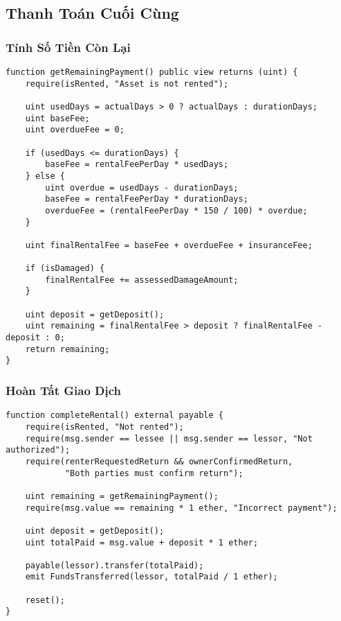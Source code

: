 \documentclass[12pt,a4paper]{article}
\begin{document}
\subsection{Thanh Toán Cuối Cùng}

\subsubsection{Tính Số Tiền Còn Lại}
\begin{lstlisting}[language=Solidity, caption=Tính toán số tiền còn phải trả]
function getRemainingPayment() public view returns (uint) {
    require(isRented, "Asset is not rented");

    uint usedDays = actualDays > 0 ? actualDays : durationDays;
    uint baseFee;
    uint overdueFee = 0;

    if (usedDays <= durationDays) {
        baseFee = rentalFeePerDay * usedDays;
    } else {
        uint overdue = usedDays - durationDays;
        baseFee = rentalFeePerDay * durationDays;
        overdueFee = (rentalFeePerDay * 150 / 100) * overdue;
    }

    uint finalRentalFee = baseFee + overdueFee + insuranceFee;

    if (isDamaged) {
        finalRentalFee += assessedDamageAmount;
    }

    uint deposit = getDeposit();
    uint remaining = finalRentalFee > deposit ? finalRentalFee - deposit : 0;
    return remaining;
}
\end{lstlisting}

\subsubsection{Hoàn Tất Giao Dịch}
\begin{lstlisting}[language=Solidity, caption=Hoàn tất và thanh toán cuối cùng]
function completeRental() external payable {
    require(isRented, "Not rented");
    require(msg.sender == lessee || msg.sender == lessor, "Not authorized");
    require(renterRequestedReturn && ownerConfirmedReturn, 
            "Both parties must confirm return");

    uint remaining = getRemainingPayment();
    require(msg.value == remaining * 1 ether, "Incorrect payment");

    uint deposit = getDeposit();
    uint totalPaid = msg.value + deposit * 1 ether;

    payable(lessor).transfer(totalPaid);
    emit FundsTransferred(lessor, totalPaid / 1 ether);

    reset();
}
\end{lstlisting}
\end{document}
